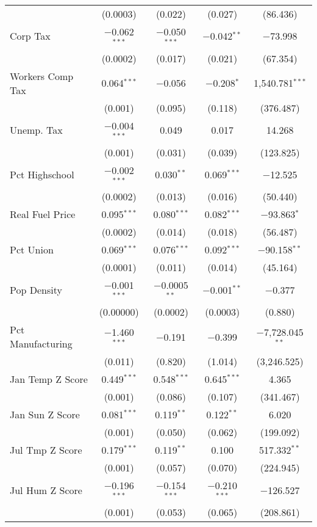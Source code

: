 \begin{table}[!htbp]
\begin{tabular}{@{\extracolsep{5pt}}lcccc}
  & (0.0003) & (0.022) & (0.027) & (86.436) \\ 
  Corp Tax & $-$0.062$^{***}$ & $-$0.050$^{***}$ & $-$0.042$^{**}$ & $-$73.998 \\ 
  & (0.0002) & (0.017) & (0.021) & (67.354) \\ 
  Workers Comp Tax & 0.064$^{***}$ & $-$0.056 & $-$0.208$^{*}$ & 1,540.781$^{***}$ \\ 
  & (0.001) & (0.095) & (0.118) & (376.487) \\ 
  Unemp. Tax & $-$0.004$^{***}$ & 0.049 & 0.017 & 14.268 \\ 
  & (0.001) & (0.031) & (0.039) & (123.825) \\ 
  Pct Highschool & $-$0.002$^{***}$ & 0.030$^{**}$ & 0.069$^{***}$ & $-$12.525 \\ 
  & (0.0002) & (0.013) & (0.016) & (50.440) \\ 
  Real Fuel Price & 0.095$^{***}$ & 0.080$^{***}$ & 0.082$^{***}$ & $-$93.863$^{*}$ \\ 
  & (0.0002) & (0.014) & (0.018) & (56.487) \\ 
  Pct Union & 0.069$^{***}$ & 0.076$^{***}$ & 0.092$^{***}$ & $-$90.158$^{**}$ \\ 
  & (0.0001) & (0.011) & (0.014) & (45.164) \\ 
  Pop Density & $-$0.001$^{***}$ & $-$0.0005$^{**}$ & $-$0.001$^{**}$ & $-$0.377 \\ 
  & (0.00000) & (0.0002) & (0.0003) & (0.880) \\ 
  Pct Manufacturing & $-$1.460$^{***}$ & $-$0.191 & $-$0.399 & $-$7,728.045$^{**}$ \\ 
  & (0.011) & (0.820) & (1.014) & (3,246.525) \\ 
  Jan Temp Z Score & 0.449$^{***}$ & 0.548$^{***}$ & 0.645$^{***}$ & 4.365 \\ 
  & (0.001) & (0.086) & (0.107) & (341.467) \\ 
  Jan Sun Z Score & 0.081$^{***}$ & 0.119$^{**}$ & 0.122$^{**}$ & 6.020 \\ 
  & (0.001) & (0.050) & (0.062) & (199.092) \\ 
  Jul Tmp Z Score & 0.179$^{***}$ & 0.119$^{**}$ & 0.100 & 517.332$^{**}$ \\ 
  & (0.001) & (0.057) & (0.070) & (224.945) \\ 
  Jul Hum Z Score & $-$0.196$^{***}$ & $-$0.154$^{***}$ & $-$0.210$^{***}$ & $-$126.527 \\ 
  & (0.001) & (0.053) & (0.065) & (208.861) \\ 

\end{tabular}
\end{table}
